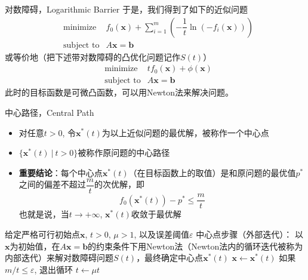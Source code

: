 
\begin{frame}

\begin{block}{对数障碍，Logarithmic Barrier}
于是，我们得到了如下的近似问题
\begin{eqnarray*}
& \text{minimize} & f_0(\mathbf{x}) + \sum\limits_{i=1}^m \left( -\dfrac{1}{t}\ln(-f_i(\mathbf{x})) \right) \\
& \text{subject to} & A\mathbf{x} = \mathbf{b}
\end{eqnarray*}
或等价地（把下述带对数障碍的凸优化问题记作$S(t)$）
\begin{eqnarray*}
& \text{minimize} & tf_0(\mathbf{x}) + \phi(\mathbf{x}) \\
& \text{subject to} & A\mathbf{x} = \mathbf{b}
\end{eqnarray*}
此时的目标函数是可微凸函数，可以用Newton法来解决问题。
\end{block}

\end{frame}


\begin{frame}

\begin{block}{中心路径，Central Path}
\begin{itemize}
\item 对任意$t>0$, 令$\mathbf{x}^*(t)$为以上近似问题的最优解，被称作一个中心点
\item $\{\mathbf{x}^*(t) \ |\ t > 0\}$被称作原问题的中心路径
\item {\bfseries 重要结论}：每个中心点$\mathbf{x}^*(t)$（在目标函数上的取值）是和原问题的最优值$p^*$之间的偏差不超过$\dfrac{m}{t}$的次优解，即
\[f_0(\mathbf{x}^*(t)) - p^* \le \dfrac{m}{t}\]
也就是说，当$t\to+\infty$, $\mathbf{x}^*(t)$收敛于最优解
\end{itemize}
\end{block}

\end{frame}


\begin{frame}

\begin{algorithm}[H]
\SetAlgoLined
\DontPrintSemicolon
{}

给定严格可行初始点$\mathbf{x}$, $t > 0$, $\mu > 1$, 以及误差阈值$\varepsilon$ \;
{
中心点步骤（外部迭代）：\newline
\hspace{1em}以$\mathbf{x}$为初始值，在$A\mathbf{x} = \mathbf{b}$的约束条件下用Newton法（Newton法内的循环迭代被称为内部迭代）来解对数障碍问题$S(t)$，最终确定中心点$\mathbf{x}^*(t)$ \;
$\mathbf{x} \gets \mathbf{x}^*(t)$ \;
如果$m/t \le \varepsilon$, 退出循环 \;
$t \gets \mu t$
}
\caption{内点法（障碍方法）}
\end{algorithm}

\end{frame}

